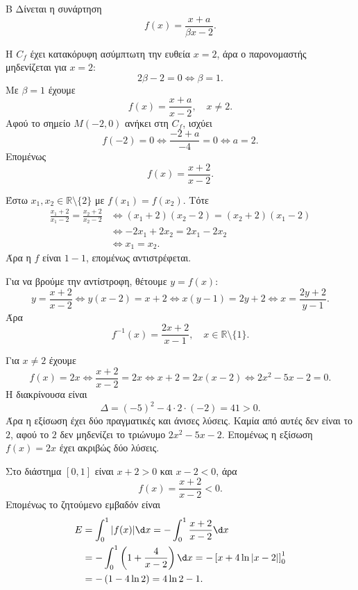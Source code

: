 \begin{thema}{Β}
Δίνεται η συνάρτηση
\[
f(x)=\frac{x+a}{\beta x-2}.
\]

\begin{erwthma}
\item Η $C_f$ έχει κατακόρυφη ασύμπτωτη την ευθεία $x=2$, άρα ο παρονομαστής μηδενίζεται για $x=2$:
\[
2\beta-2=0\Leftrightarrow \beta=1.
\]
Με $\beta=1$ έχουμε
\[
f(x)=\frac{x+a}{x-2},\quad x\neq2.
\]
Αφού το σημείο $M(-2,0)$ ανήκει στη $C_f$, ισχύει
\[
f(-2)=0\Leftrightarrow \frac{-2+a}{-4}=0\Leftrightarrow a=2.
\]
Επομένως
\[
f(x)=\frac{x+2}{x-2}.
\]

\item Έστω $x_1,x_2\in\mathbb{R}\setminus\{2\}$ με $f(x_1)=f(x_2)$. Τότε
\begin{align*}
\frac{x_1+2}{x_1-2}=\frac{x_2+2}{x_2-2}
&\Leftrightarrow (x_1+2)(x_2-2)=(x_2+2)(x_1-2)\\
&\Leftrightarrow -2x_1+2x_2=2x_1-2x_2\\
&\Leftrightarrow x_1=x_2.
\end{align*}
Άρα η $f$ είναι $1-1$, επομένως αντιστρέφεται.

Για να βρούμε την αντίστροφη, θέτουμε $y=f(x)$:
\[
y=\frac{x+2}{x-2}
\Leftrightarrow y(x-2)=x+2
\Leftrightarrow x(y-1)=2y+2
\Leftrightarrow x=\frac{2y+2}{y-1}.
\]
Άρα
\[
f^{-1}(x)=\frac{2x+2}{x-1},\quad x\in\mathbb{R}\setminus\{1\}.
\]

\item Για $x\neq2$ έχουμε
\[
f(x)=2x
\Leftrightarrow \frac{x+2}{x-2}=2x
\Leftrightarrow x+2=2x(x-2)
\Leftrightarrow 2x^2-5x-2=0.
\]
Η διακρίνουσα είναι
\[
\Delta=(-5)^2-4\cdot2\cdot(-2)=41>0.
\]
Άρα η εξίσωση έχει δύο πραγματικές και άνισες λύσεις. Καμία από αυτές δεν είναι το $2$, αφού το $2$ δεν μηδενίζει το τριώνυμο $2x^2-5x-2$. Επομένως η εξίσωση $f(x)=2x$ έχει ακριβώς δύο λύσεις.

\item Στο διάστημα $[0,1]$ είναι $x+2>0$ και $x-2<0$, άρα
\[
f(x)=\frac{x+2}{x-2}<0.
\]
Επομένως το ζητούμενο εμβαδόν είναι
\begin{align*}
E&=\int_0^1 |f(x)|\d x
=-\int_0^1\frac{x+2}{x-2}\d x\\
&=-\int_0^1\left(1+\frac{4}{x-2}\right)\d x
=-\left[x+4\ln|x-2|\right]_0^1\\
&=-\left(1-4\ln2\right)=4\ln2-1.
\end{align*}
\end{erwthma}
\end{thema}

